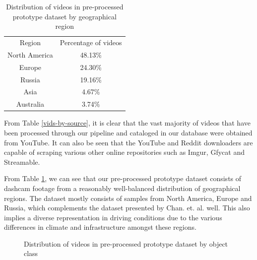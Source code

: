 \documentclass[letterpaper, 10 pt, conference]{ieeeconf}
\begin{document}
\begin{table}[!h]
	\caption{Distribution of videos in pre-processed prototype dataset by geographical region}
	\label{vids-by-region}
	\begin{center}
		\begin{tabular}{|c|c|}
			\hline
			Region & Percentage of videos \\
			North America & 48.13\% \\
			Europe & 24.30\% \\
			Russia & 19.16\% \\
			Asia & 4.67\% \\
			Australia & 3.74\% \\
			\hline
		\end{tabular}
	\end{center}
\end{table}

From Table \ref{vids-by-source}, it is clear that the vast majority of videos that have been processed through our pipeline and cataloged in our database were obtained from YouTube. It can also be seen that the YouTube and Reddit downloaders are capable of scraping various other online repositories such as Imgur, Gfycat and Streamable. 

From Table \ref{vids-by-region}, we can see that our pre-processed prototype dataset consists of dashcam footage from a reasonably well-balanced distribution of geographical regions. The dataset mostly consists of samples from North America, Europe and Russia, which complements the dataset presented by Chan. et. al. \cite{chan2016anticipating} well. This also implies a diverse representation in driving conditions due to the various differences in climate and infrastructure amongst these regions.

\begin{figure}[!h]
	\centering
	\caption{Distribution of videos in pre-processed prototype dataset by object class}
	\label{fig:obj-by-class}
\end{figure}
\end{document}
